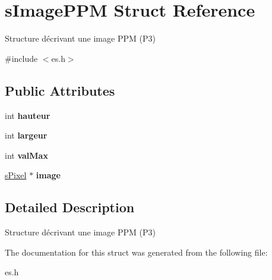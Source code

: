 \hypertarget{structs_image_p_p_m}{}\section{s\+Image\+P\+PM Struct Reference}
\label{structs_image_p_p_m}


Structure décrivant une image P\+PM (P3)  




{\ttfamily \#include $<$es.\+h$>$}

\subsection*{Public Attributes}
\begin{DoxyCompactItemize}
\item 
\mbox{\label{structs_image_p_p_m_ab8a1c207163cb1395526a72bfb5a32f8}} 
int {\bfseries hauteur}
\item 
\mbox{\label{structs_image_p_p_m_a5e213de573190dc7c00856fcf8c0b247}} 
int {\bfseries largeur}
\item 
\mbox{\label{structs_image_p_p_m_a411562506066f8659591ea2a067e447a}} 
int {\bfseries val\+Max}
\item 
\mbox{\label{structs_image_p_p_m_a1732f2223db8fad05d9c1c729ff8bd1d}} 
\mbox{\hyperlink{structs_pixel}{s\+Pixel}} $\ast$ {\bfseries image}
\end{DoxyCompactItemize}


\subsection{Detailed Description}
Structure décrivant une image P\+PM (P3) 

The documentation for this struct was generated from the following file\+:\begin{DoxyCompactItemize}
\item 
es.\+h\end{DoxyCompactItemize}
